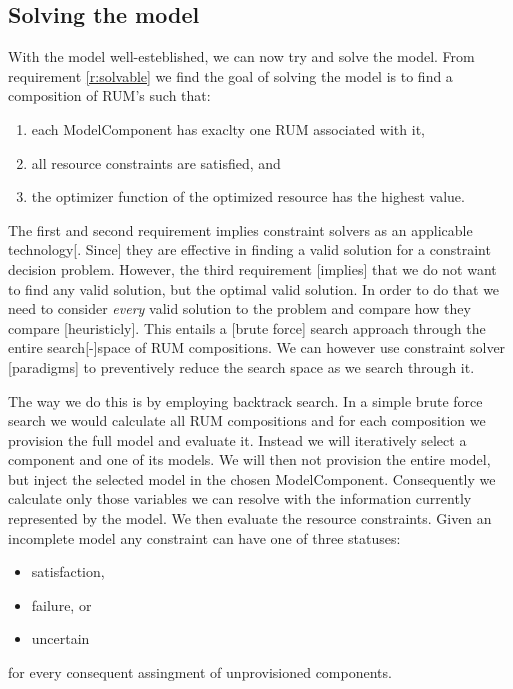\subsection{Solving the model}
With the model well-esteblished, we can now try and solve the model. From requirement \ref{r:solvable} we find the goal of solving the model is to find a composition of RUM's such that:
\begin{enumerate}
\item each ModelComponent has exaclty one RUM associated with it,
\item all resource constraints are satisfied, and
\item the optimizer function of the optimized resource has the highest value.
\end{enumerate}
The first and second requirement implies constraint solvers as an applicable technology[. Since] they are effective in finding a valid solution for a constraint decision problem. However, the third requirement [implies] that we do not want to find any valid solution, but the optimal valid solution. In order to do that we need to consider \emph{every} valid solution to the problem and compare how they compare [heuristicly]. This entails a [brute force] search approach through the entire search[-]space of RUM compositions. We can however use constraint solver [paradigms] to preventively reduce the search space as we search through it.

The way we do this is by employing backtrack search. In a simple brute force search we would calculate all RUM compositions and for each composition we provision the full model and evaluate it. Instead we will iteratively select a component and one of its models. We will then not provision the entire model, but inject the selected model in the chosen ModelComponent. Consequently we calculate only those variables we can resolve with the information currently represented by the model. We then evaluate the resource constraints. Given an incomplete model any constraint can have one of three statuses:
\begin{itemize}
\item satisfaction,
\item failure, or
\item uncertain
\end{itemize}
for every consequent assingment of unprovisioned components.


